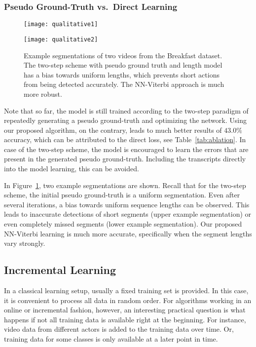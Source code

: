 \documentclass[10pt,twocolumn,letterpaper]{article}
\begin{document}
\subsubsection{Pseudo Ground-Truth vs.\ Direct Learning}
\begin{figure}[tb]
    \centering
    \texttt{[image: qualitative1]}

    \vspace{0.3cm}
    \texttt{[image: qualitative2]}
    \caption{Example segmentations of two videos from the Breakfast dataset. The two-step scheme
             with pseudo ground truth and length model has a bias towards uniform lengths, which prevents short
             actions from being detected accurately. The NN-Viterbi approach is much more robust.}
    \label{fig:qualitative}
    \vspace{-0.3cm}
\end{figure}
Note that so far, the model is still trained according to the two-step paradigm of repeatedly
generating a pseudo ground-truth and optimizing the network. Using our proposed algorithm,
on the contrary, leads to much better results of $ 43.0\% $ accuracy, which can be attributed
to the direct loss, see Table~\ref{tab:ablation}. In case of the two-step scheme, the model is encouraged to learn
the errors that are present in the generated pseudo ground-truth. Including the transcripts
directly into the model learning, this can be avoided.

In Figure~\ref{fig:qualitative}, two example segmentations are shown. Recall that for the two-step
scheme, the initial pseudo ground-truth is a uniform segmentation. Even after several iterations,
a bias towards uniform sequence lengths can be observed. This leads to inaccurate detections of
short segments (upper example segmentation) or even completely missed segments (lower example segmentation).
Our proposed NN-Viterbi learning is much more accurate, specifically when the segment lengths
vary strongly.

\subsection{Incremental Learning}
\label{sec:incremental}

In a classical learning setup, usually a fixed training set is provided. In this case,
it is convenient to process all data in random order.
For algorithms working in an online or incremental fashion,
however, an interesting practical question is what happens if not all training data is
available right at the beginning. For instance, video data from different actors is
added to the training data over time. Or, training data for some classes is only available
at a later point in time.
\end{document}
